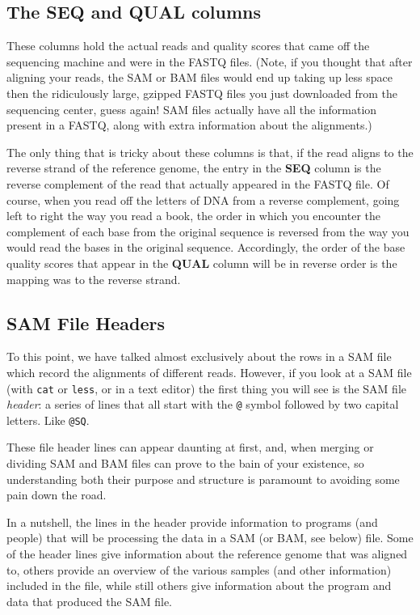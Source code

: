 \documentclass[]{krantz}
\begin{document}
\hypertarget{the-seq-and-qual-columns}{%
\subsection{The SEQ and QUAL columns}\label{the-seq-and-qual-columns}}

These columns hold the actual reads and quality scores that came off the
sequencing machine and were in the FASTQ files. (Note, if you thought that
after aligning your reads, the SAM or BAM files would end up taking up less space then the ridiculously
large, gzipped FASTQ files you just downloaded from the sequencing center,
guess again! SAM files actually have all the information present in a FASTQ, along with extra
information about the alignments.)

The only thing that is tricky about these columns is that, if the read aligns to the
reverse strand of the reference genome, the entry in the \textbf{SEQ} column is the
reverse complement of the read that actually appeared in the FASTQ file. Of course,
when you read off the letters of DNA from a reverse complement, going left to right
the way you read a book, the order in which you encounter the complement of each base
from the original sequence is reversed from the way you would read the bases
in the original sequence. Accordingly, the order of the base quality scores that
appear in the \textbf{QUAL} column will be in reverse order is the mapping was to the
reverse strand.

\hypertarget{sam-headers}{%
\subsection{SAM File Headers}\label{sam-headers}}

To this point, we have talked almost exclusively about the rows in a SAM file
which record the alignments of different reads. However, if you look at a SAM file
(with \texttt{cat} or \texttt{less}, or in a text editor) the first thing you will see is the
SAM file \emph{header}: a series of lines that all start with the \texttt{@} symbol followed by
two capital letters. Like \texttt{@SQ}.

These file header lines can appear daunting at first, and, when merging or dividing
SAM and BAM files can prove to the bain of your existence, so understanding both their
purpose and structure is paramount to avoiding some pain down the road.

In a nutshell, the lines in the header provide information to programs (and people)
that will be processing the data in a SAM (or BAM, see below) file. Some of the header
lines give information about the reference genome that was aligned to, others
provide an overview of the various samples (and other information) included in the file,
while still others give information about the program and data that produced the
SAM file.
\end{document}
